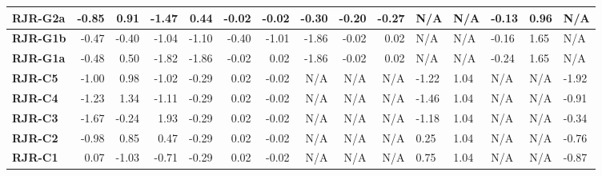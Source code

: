 \begin{table}
\begin{center}
{\begin{tabular*}{\textwidth}{@{\extracolsep{\fill}}lrrrrrrrrr}
\hline
{\bf RJR-G2a} & -0.85   & 0.91   & -1.47   & 0.44   & -0.02   & -0.02   & -0.30   & -0.20   & -0.27   & N/A   & N/A   & -0.13   & 0.96   & N/A  \\
\hline
{\bf RJR-G1b} & -0.47   & -0.40   & -1.04   & -1.10   & -0.40   & -1.01   & -1.86   & -0.02   & 0.02   & N/A   & N/A   & -0.16   & 1.65   & N/A  \\
\hline
{\bf RJR-G1a} & -0.48   & 0.50   & -1.82   & -1.86   & -0.02   & 0.02   & -1.86   & -0.02   & 0.02   & N/A   & N/A   & -0.24   & 1.65   & N/A  \\
\hline
{\bf RJR-C5} & -1.00   & 0.98   & -1.02   & -0.29   & 0.02   & -0.02   & N/A   & N/A   & N/A   & -1.22   & 1.04   & N/A   & N/A   & -1.92  \\
\hline
{\bf RJR-C4} & -1.23   & 1.34   & -1.11   & -0.29   & 0.02   & -0.02   & N/A   & N/A   & N/A   & -1.46   & 1.04   & N/A   & N/A   & -0.91  \\
\hline
{\bf RJR-C3} & -1.67   & -0.24   & 1.93   & -0.29   & 0.02   & -0.02   & N/A   & N/A   & N/A   & -1.18   & 1.04   & N/A   & N/A   & -0.34  \\
\hline
{\bf RJR-C2} & -0.98   & 0.85   & 0.47   & -0.29   & 0.02   & -0.02   & N/A   & N/A   & N/A   & 0.25   & 1.04   & N/A   & N/A   & -0.76  \\
\hline
{\bf RJR-C1} & 0.07   & -1.03   & -0.71   & -0.29   & 0.02   & -0.02   & N/A   & N/A   & N/A   & 0.75   & 1.04   & N/A   & N/A   & -0.87  \\
\hline


\end{tabular*}
}
\end{center}

\end{table}
